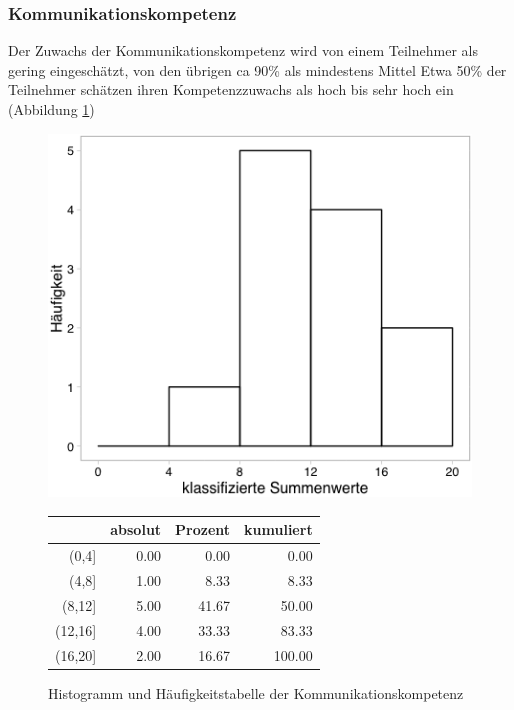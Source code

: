\documentclass[12pt, bibliography=totoc]{scrartcl}
\begin{document}
\subsubsection{Kommunikationskompetenz}\label{kommunikationskompetenz}

Der Zuwachs der Kommunikationskompetenz wird von einem Teilnehmer als
gering eingeschätzt, von den übrigen ca 90\% als mindestens Mittel Etwa
50\% der Teilnehmer schätzen ihren Kompetenzzuwachs als hoch bis sehr
hoch ein (Abbildung \ref{fig:KK})

\begin{figure}[H]
\begin{minipage}{.4\linewidth}
\includegraphics[width=0.8\linewidth]{Anhang/KKHistnn.png}

\label{pic:aufbau}
\end{minipage}
\begin{minipage}{.4\linewidth}
\centering
\raisebox{\depth}
{\begin{tabular}{rrrr}
  \hline
 & absolut & Prozent & kumuliert \\
  \hline
(0,4] & 0.00 & 0.00 & 0.00 \\
  (4,8] & 1.00 & 8.33 & 8.33 \\
  (8,12] & 5.00 & 41.67 & 50.00 \\
  (12,16] & 4.00 & 33.33 & 83.33 \\
  (16,20] & 2.00 & 16.67 & 100.00 \\
   \hline
\end{tabular}

}
\label{tab:defis}
\end{minipage}
\caption{Histogramm und Häufigkeitstabelle der Kommunikationskompetenz}
\label{fig:KK}
\end{figure}
\end{document}
